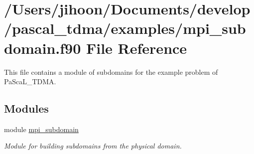 \hypertarget{mpi__subdomain_8f90}{}\section{/\+Users/jihoon/\+Documents/develop/pascal\+\_\+tdma/examples/mpi\+\_\+subdomain.f90 File Reference}
\label{mpi__subdomain_8f90}


This file contains a module of subdomains for the example problem of Pa\+Sca\+L\+\_\+\+T\+D\+MA.  


\subsection*{Modules}
\begin{DoxyCompactItemize}
\item 
module \mbox{\hyperlink{namespacempi__subdomain}{mpi\+\_\+subdomain}}
\begin{DoxyCompactList}\small\item\em Module for building subdomains from the physical domain. \end{DoxyCompactList}\end{DoxyCompactItemize}
